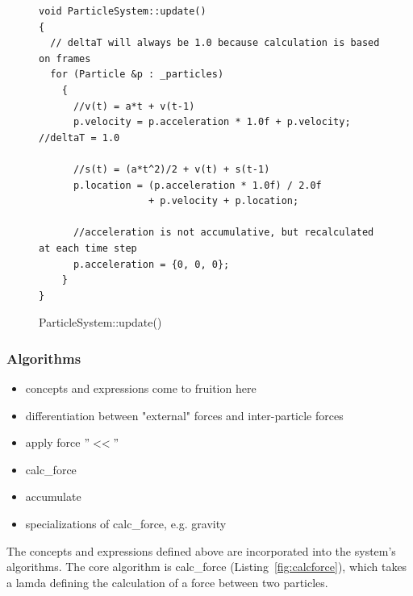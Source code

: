 \documentclass[runningheads,a4paper]{llncs}
\begin{document}
\begin{figure}[tb]
\begin{lstlisting}
void ParticleSystem::update()                                                              
{                                                                                          
  // deltaT will always be 1.0 because calculation is based on frames                               
  for (Particle &p : _particles)                                                           
    {                                                                                      
      //v(t) = a*t + v(t-1)                                                            
      p.velocity = p.acceleration * 1.0f + p.velocity; //deltaT = 1.0                                  
                                                                                           
      //s(t) = (a*t^2)/2 + v(t) + s(t-1)                                               
      p.location = (p.acceleration * 1.0f) / 2.0f
      			   + p.velocity + p.location;
                                       	
      //acceleration is not accumulative, but recalculated at each time step          
      p.acceleration = {0, 0, 0};
    }                                                                                      
}                                                            
\end{lstlisting}
 \caption{ParticleSystem::update()}
 \label{fig:update}
\end{figure}

\subsubsection{Algorithms}
\begin{itemize}
\item concepts and expressions come to fruition here
\item differentiation between "external" forces and inter-particle forces
\item apply force $"<<"$
\item calc\_force
\item accumulate
\item specializations of calc\_force, e.g. gravity
\end{itemize}

The concepts and expressions defined above are incorporated into the system's algorithms. The core algorithm is calc\_force (Listing~\ref{fig:calcforce}), which takes a lamda defining the calculation of a force between two particles. 
\end{document}
